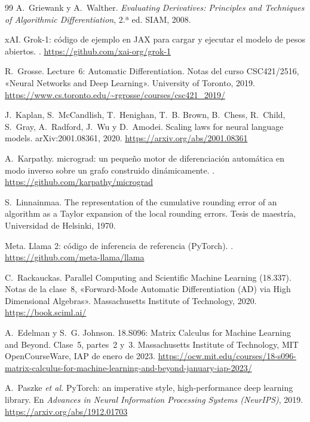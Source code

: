 \begin{thebibliography}{99}
A.~Griewank y A.~Walther.
\newblock \emph{Evaluating Derivatives: Principles and Techniques of Algorithmic Differentiation}, 2.ª ed.
\newblock SIAM, 2008.

xAI.
\newblock Grok-1: código de ejemplo en JAX para cargar y ejecutar el modelo de pesos abiertos.
.
\newblock \url{https://github.com/xai-org/grok-1}

R.~Grosse.
\newblock Lecture~6: Automatic Differentiation. Notas del curso CSC421/2516, «Neural Networks and Deep Learning».
\newblock University of Toronto, 2019.
\newblock \url{https://www.cs.toronto.edu/~rgrosse/courses/csc421_2019/}

J.~Kaplan, S.~McCandlish, T.~Henighan, T.~B. Brown, B.~Chess, R.~Child, S.~Gray, A.~Radford, J.~Wu y D.~Amodei.
\newblock Scaling laws for neural language models.
\newblock arXiv:2001.08361, 2020.
\newblock \url{https://arxiv.org/abs/2001.08361}

A.~Karpathy.
\newblock micrograd: un pequeño motor de diferenciación automática en modo inverso sobre un grafo construido dinámicamente.
.
\newblock \url{https://github.com/karpathy/micrograd}

S.~Linnainmaa.
\newblock The representation of the cumulative rounding error of an algorithm as a Taylor expansion of the local rounding errors.
\newblock Tesis de maestría, Universidad de Helsinki, 1970.

Meta.
\newblock Llama 2: código de inferencia de referencia (PyTorch).
.
\newblock \url{https://github.com/meta-llama/llama}

C.~Rackauckas.
\newblock Parallel Computing and Scientific Machine Learning (18.337). Notas de la clase~8, «Forward-Mode Automatic Differentiation (AD) via High Dimensional Algebras».
\newblock Massachusetts Institute of Technology, 2020.
\newblock \url{https://book.sciml.ai/}

A.~Edelman y S.~G. Johnson.
\newblock 18.S096: Matrix Calculus for Machine Learning and Beyond. Clase~5, partes~2 y~3.
\newblock Massachusetts Institute of Technology, MIT OpenCourseWare, IAP de enero de 2023.
\newblock \url{https://ocw.mit.edu/courses/18-s096-matrix-calculus-for-machine-learning-and-beyond-january-iap-2023/}

A.~Paszke \emph{et al.}
\newblock PyTorch: an imperative style, high-performance deep learning library.
\newblock En \emph{Advances in Neural Information Processing Systems (NeurIPS)}, 2019.
\newblock \url{https://arxiv.org/abs/1912.01703}


\end{thebibliography}

